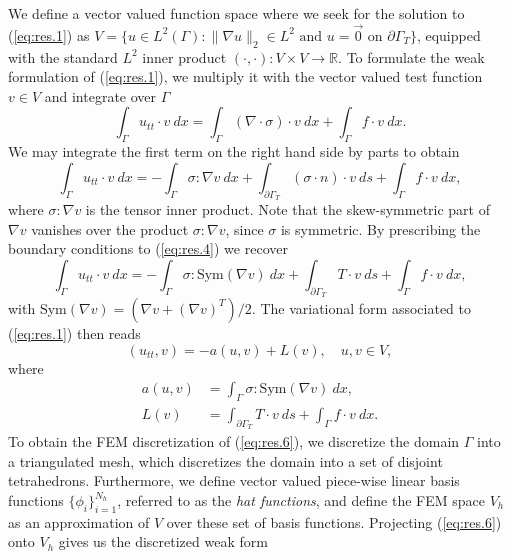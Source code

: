 We define a vector valued function space where we seek for the solution to (\ref{eq:res.1}) as $V = \{ u \in L^2(\Gamma) : \| \nabla u \|_2 \in L^2 \text{ and } u = \vec 0 \text{ on } \partial \Gamma_T \}$, equipped with the standard $L^2$ inner product $(\cdot,\cdot):V\times V \to \mathbb R$. To formulate the weak formulation of (\ref{eq:res.1}), we multiply it with the vector valued test function $v \in V$ and integrate over $\Gamma$
\begin{equation}  \label{eq:res.3}
	\int_{\Gamma} u_{tt} \cdot v\ dx = \int_{\Gamma} (\nabla \cdot \sigma) \cdot v \ dx + \int_{\Gamma} f \cdot v \ dx.
\end{equation}
We may integrate the first term on the right hand side by parts to obtain
\begin{equation}  \label{eq:res.4}
	\int_{\Gamma} u_{tt} \cdot v\ dx = - \int_{\Gamma} \sigma : \nabla v \ dx+ \int_{\partial \Gamma_T} (\sigma \cdot n) \cdot v\ ds +  \int_{\Gamma} f \cdot v \ dx,
\end{equation}
where $\sigma : \nabla v$ is the tensor inner product. Note that the skew-symmetric part of $\nabla v$ vanishes over the product $\sigma : \nabla v$, since $\sigma$ is symmetric. By prescribing the boundary conditions to (\ref{eq:res.4}) we recover
\begin{equation} \label{eq:res.5}
	\int_{\Gamma} u_{tt} \cdot v\ dx = - \int_{\Gamma} \sigma : \text{Sym}(\nabla v) \ dx+ \int_{\partial \Gamma_T} T \cdot v\ ds +  \int_{\Gamma} f \cdot v \ dx,
\end{equation}
with Sym$(\nabla v) = (\nabla v + (\nabla v)^T)/2$. The variational form associated to (\ref{eq:res.1}) then reads
\begin{equation} \label{eq:res.6}
	(u_{tt},v) = - a(u,v) + L(v), \quad u,v\in V,
\end{equation}
where
\begin{equation} \label{eq:res.7}
\begin{aligned}
	a(u,v) &= \int_{\Gamma} \sigma : \text{Sym}(\nabla v) \ dx, \\
	L(v) &= \int_{\partial \Gamma_T} T \cdot v\ ds +  \int_{\Gamma} f \cdot v \ dx.
\end{aligned}
\end{equation}
To obtain the FEM discretization of (\ref{eq:res.6}), we discretize the domain $\Gamma$ into a triangulated mesh, which discretizes the domain into a set of disjoint tetrahedrons. Furthermore, we define vector valued piece-wise linear basis functions $\{\phi_i\}_{i=1}^{N_h}$, referred to as the \emph{hat functions}, and define the FEM space $V_h$ as an approximation of $V$ over these set of basis functions. Projecting (\ref{eq:res.6}) onto $V_h$ gives us the discretized weak form
